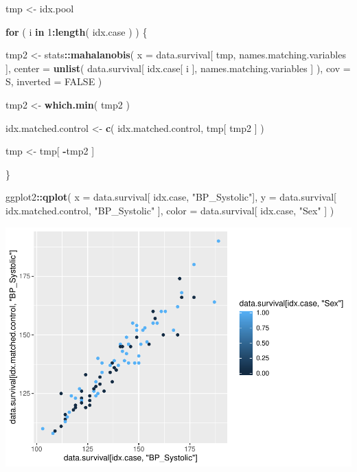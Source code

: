 \documentclass[]{article}
\newenvironment{Shaded}{\begin{snugshade}}{\end{snugshade}}
\newcommand{\ControlFlowTok}[1]{\textcolor[rgb]{0.13,0.29,0.53}{\textbf{#1}}}
\newcommand{\DataTypeTok}[1]{\textcolor[rgb]{0.13,0.29,0.53}{#1}}
\newcommand{\DecValTok}[1]{\textcolor[rgb]{0.00,0.00,0.81}{#1}}
\newcommand{\KeywordTok}[1]{\textcolor[rgb]{0.13,0.29,0.53}{\textbf{#1}}}
\newcommand{\NormalTok}[1]{#1}
\newcommand{\OperatorTok}[1]{\textcolor[rgb]{0.81,0.36,0.00}{\textbf{#1}}}
\newcommand{\OtherTok}[1]{\textcolor[rgb]{0.56,0.35,0.01}{#1}}
\newcommand{\StringTok}[1]{\textcolor[rgb]{0.31,0.60,0.02}{#1}}
\begin{document}
\begin{Shaded}
\begin{Highlighting}[]
\NormalTok{tmp <-}\StringTok{ }\NormalTok{idx.pool}
  
\ControlFlowTok{for}\NormalTok{ ( i }\ControlFlowTok{in} \DecValTok{1}\OperatorTok{:}\KeywordTok{length}\NormalTok{( idx.case ) ) \{}

\NormalTok{  tmp2 <-}\StringTok{ }
\StringTok{    }\NormalTok{stats}\OperatorTok{::}\KeywordTok{mahalanobis}\NormalTok{(}
      \DataTypeTok{x =}\NormalTok{ data.survival[ tmp, names.matching.variables ], }
      \DataTypeTok{center =} \KeywordTok{unlist}\NormalTok{( data.survival[ idx.case[ i ], names.matching.variables ] ),}
      \DataTypeTok{cov =}\NormalTok{ S,}
      \DataTypeTok{inverted =} \OtherTok{FALSE}
\NormalTok{    )}
  
\NormalTok{  tmp2 <-}\StringTok{ }\KeywordTok{which.min}\NormalTok{( tmp2 )}
  
\NormalTok{  idx.matched.control <-}\StringTok{ }\KeywordTok{c}\NormalTok{( idx.matched.control, tmp[ tmp2 ] )}
  
\NormalTok{  tmp <-}\StringTok{ }\NormalTok{tmp[ }\OperatorTok{-}\NormalTok{tmp2 ]}
  
\NormalTok{\}}

\NormalTok{ggplot2}\OperatorTok{::}\KeywordTok{qplot}\NormalTok{(}
  \DataTypeTok{x =}\NormalTok{ data.survival[ idx.case, }\StringTok{"BP_Systolic"}\NormalTok{], }
  \DataTypeTok{y =}\NormalTok{ data.survival[ idx.matched.control, }\StringTok{"BP_Systolic"}\NormalTok{ ], }
  \DataTypeTok{color =}\NormalTok{ data.survival[ idx.case, }\StringTok{"Sex"}\NormalTok{ ]}
\NormalTok{)}
\end{Highlighting}
\end{Shaded}

\includegraphics{0033_PROFIL--Metabolomics_files/figure-latex/Myo-I-Matched-Subset-1.pdf}
\end{document}
